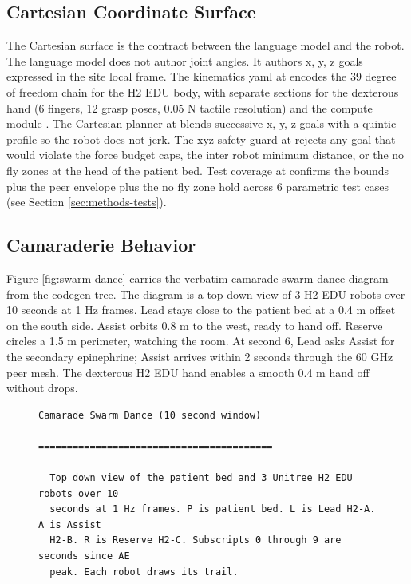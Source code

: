 \begin{sectionaccent}
\subsection{Cartesian Coordinate Surface}
\label{sec:methods-cartesian}

The Cartesian surface is the contract between the language model and
the robot. The language model does not author joint angles. It
authors x, y, z goals expressed in the site local frame. The
kinematics yaml at  encodes the
39 degree of freedom chain for the H2 EDU body, with separate
sections for the dexterous hand (6 fingers, 12 grasp poses, 0.05 N
tactile resolution) and the compute module
\cite{unitree_h2_2026, nvidia_jetson_thor_2026}. The Cartesian
planner at  blends successive x, y, z goals
with a quintic profile so the robot does not jerk. The xyz safety
guard at  rejects any goal that would violate the
force budget caps, the inter robot minimum distance, or the no fly
zones at the head of the patient bed. Test coverage at
 confirms the bounds
plus the peer envelope plus the no fly zone hold across 6 parametric
test cases (see Section \ref{sec:methods-tests}).

\subsection{Camaraderie Behavior}
\label{sec:methods-camaraderie}

Figure \ref{fig:swarm-dance} carries the verbatim camarade swarm
dance diagram from the codegen tree. The diagram is a top down view
of 3 H2 EDU robots over 10 seconds at 1 Hz frames. Lead stays close
to the patient bed at a 0.4 m offset on the south side. Assist orbits
0.8 m to the west, ready to hand off. Reserve circles a 1.5 m
perimeter, watching the room. At second 6, Lead asks Assist for the
secondary epinephrine; Assist arrives within 2 seconds through the
60 GHz peer mesh. The dexterous H2 EDU hand enables a smooth 0.4 m
hand off without drops.




\begin{figure}[H]
\vspace{-0.15cm}
\centering
\begin{Verbatim}[fontsize=\small]
                       Camarade Swarm Dance (10 second window)
                       =========================================

  Top down view of the patient bed and 3 Unitree H2 EDU robots over 10
  seconds at 1 Hz frames. P is patient bed. L is Lead H2-A. A is Assist
  H2-B. R is Reserve H2-C. Subscripts 0 through 9 are seconds since AE
  peak. Each robot draws its trail.


\end{Verbatim}
\end{figure}
\end{sectionaccent}
